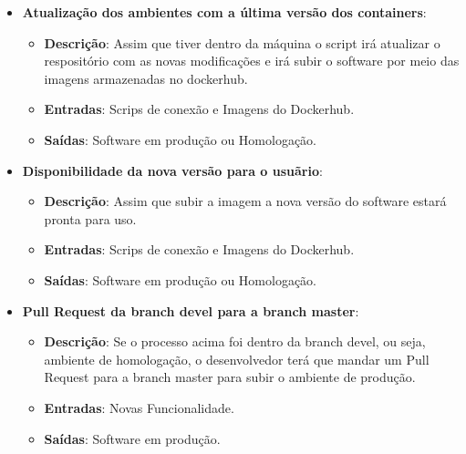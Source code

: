 \begin{itemize}
\begin{itemize}
  \end{itemize}
  \item \textbf{Atualização dos ambientes com a última versão dos containers}:
  \begin{itemize}
    \item \textbf{Descrição}: Assim que tiver dentro da máquina o script irá atualizar o respositório com as novas
    modificações e irá subir o software por meio das imagens armazenadas no dockerhub.
    \item \textbf{Entradas}: Scrips de conexão e Imagens do Dockerhub.
    \item \textbf{Saídas}: Software em produção ou Homologação.
  \end{itemize}
  \item \textbf{Disponibilidade da nova versão para o usuãrio}:
  \begin{itemize}
    \item \textbf{Descrição}: Assim que subir a imagem a nova versão do software estará pronta para uso.
    \item \textbf{Entradas}: Scrips de conexão e Imagens do Dockerhub.
    \item \textbf{Saídas}: Software em produção ou Homologação.
  \end{itemize}
  \item \textbf{Pull Request da branch devel para a branch master}:
  \begin{itemize}
    \item \textbf{Descrição}: Se o processo acima foi dentro da branch devel, ou seja, ambiente de homologação, o
    desenvolvedor terá que mandar um Pull Request para a branch master para subir o ambiente de produção.
    \item \textbf{Entradas}: Novas Funcionalidade.
    \item \textbf{Saídas}: Software em produção.
  \end{itemize}
\end{itemize}
